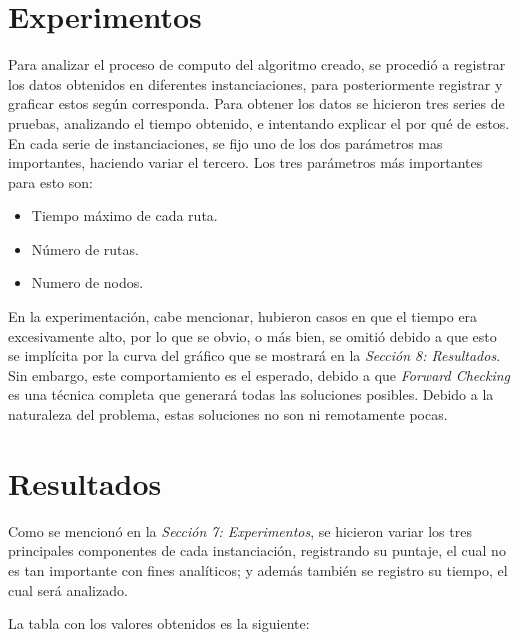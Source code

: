 \documentclass[letter, 10pt]{article}
\begin{document}
\section{Experimentos}

Para analizar el proceso de computo del algoritmo creado, se procedió a registrar los datos obtenidos en diferentes instanciaciones, para posteriormente registrar y graficar estos según corresponda. Para obtener los datos se hicieron tres series de pruebas, analizando el tiempo obtenido, e intentando explicar el por qué de estos. En cada serie de instanciaciones, se fijo uno de los dos parámetros mas importantes, haciendo variar el tercero. Los tres parámetros más importantes para esto son:
\begin{itemize}
    \item Tiempo máximo de cada ruta.
    \item Número de rutas.
    \item Numero de nodos.
\end{itemize}

En la experimentación, cabe mencionar, hubieron casos en que el tiempo era excesivamente alto, por lo que se obvio, o más bien, se omitió debido a que esto se implícita por la curva del gráfico que se mostrará en la \textit{Sección 8: Resultados}. Sin embargo, este comportamiento es el esperado, debido a que \textit{Forward Checking} es una técnica completa que generará todas las soluciones posibles. Debido a la naturaleza del problema, estas soluciones no son ni remotamente pocas.

\section{Resultados}

Como se mencionó en la \textit{Sección 7: Experimentos}, se hicieron variar los tres principales componentes de cada instanciación, registrando su puntaje, el cual no es tan importante con fines analíticos; y además también se registro su tiempo, el cual será analizado.

La tabla con los valores obtenidos es la siguiente:
\end{document}
